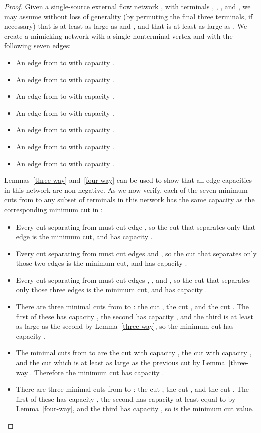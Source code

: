 \documentclass[runningheads]{llncs}
\begin{document}
\begin{proof}
Given a single-source external flow network , with terminals , , , and , we may assume without loss of generality (by permuting the final three terminals, if necessary) that  is at least as large as  and , and that  is at least as large as . We create a mimicking network with a single nonterminal vertex  and with the following seven edges:
\begin{itemize}
\item An edge from  to  with capacity .
\item An edge from  to  with capacity .
\item An edge from  to  with capacity .
\item An edge from  to  with capacity .
\item An edge from  to  with capacity .
\item An edge from  to  with capacity .
\item An edge from  to  with capacity .
\end{itemize}
Lemmas~\ref{three-way} and~\ref{four-way} can be used to show that all edge capacities in this network are non-negative.
As we now verify, each of the seven minimum cuts from  to any subset of terminals in this network has the same capacity as the corresponding minimum cut in :
\begin{itemize}
\item Every cut separating  from  must cut edge , so the cut that separates only that edge is the minimum cut, and has capacity .
\item Every cut separating  from  must cut edges  and , so the cut that separates only those two edges is the minimum cut, and has capacity .
\item Every cut separating  from  must cut edges , , and , so the cut that separates only those three edges is the minimum cut, and has capacity .
\item There are three minimal cuts from  to : the cut , the cut , and the cut . The first of these has capacity , the second has capacity , and the third is at least as large as the second by Lemma~\ref{three-way}, so the minimum cut has capacity .
\item The minimal cuts from  to  are the cut  with capacity , the cut  with capacity , and the cut  which is at least as large as the previous cut by Lemma~\ref{three-way}. Therefore the minimum cut has capacity .
\item There are three minimal cuts from  to : the cut , the cut , and the cut . The first of these has capacity , the second has capacity at least equal to  by Lemma~\ref{four-way}, and the third has capacity , so  is the minimum cut value.

\end{itemize}
\end{proof}
\end{document}
